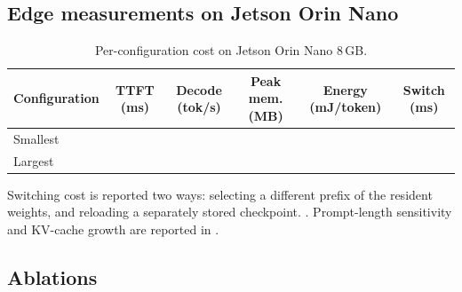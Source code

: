 \subsection{Edge measurements on Jetson Orin Nano}

\begin{table}[t]
  \caption{Per-configuration cost on Jetson Orin Nano 8\,GB. }
  \label{tab:edge}
  \begin{tabular}{lccccc}
    \toprule
    Configuration & TTFT (ms) & Decode (tok/s) & Peak mem. (MB) & Energy (mJ/token) & Switch (ms) \\
    \midrule
    Smallest & \TODO{} & \TODO{} & \TODO{} & \TODO{} & \TODO{} \\
    Largest  & \TODO{} & \TODO{} & \TODO{} & \TODO{} & \TODO{} \\
    \bottomrule
  \end{tabular}
\end{table}

Switching cost is reported two ways: selecting a different prefix of the resident weights, and reloading a separately stored checkpoint. . Prompt-length sensitivity and KV-cache growth are reported in .

\subsection{Ablations}

